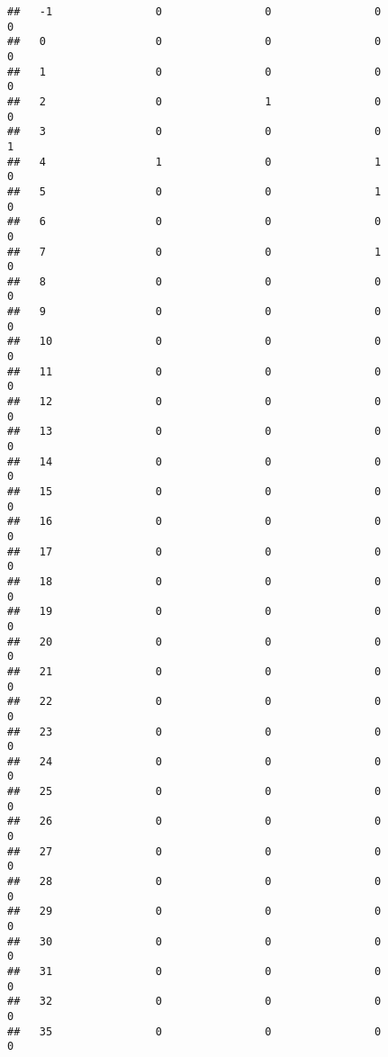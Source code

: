 \documentclass[]{article}
\begin{document}
\begin{verbatim}
##   -1                0                0                0                0
##   0                 0                0                0                0
##   1                 0                0                0                0
##   2                 0                1                0                0
##   3                 0                0                0                1
##   4                 1                0                1                0
##   5                 0                0                1                0
##   6                 0                0                0                0
##   7                 0                0                1                0
##   8                 0                0                0                0
##   9                 0                0                0                0
##   10                0                0                0                0
##   11                0                0                0                0
##   12                0                0                0                0
##   13                0                0                0                0
##   14                0                0                0                0
##   15                0                0                0                0
##   16                0                0                0                0
##   17                0                0                0                0
##   18                0                0                0                0
##   19                0                0                0                0
##   20                0                0                0                0
##   21                0                0                0                0
##   22                0                0                0                0
##   23                0                0                0                0
##   24                0                0                0                0
##   25                0                0                0                0
##   26                0                0                0                0
##   27                0                0                0                0
##   28                0                0                0                0
##   29                0                0                0                0
##   30                0                0                0                0
##   31                0                0                0                0
##   32                0                0                0                0
##   35                0                0                0                0

\end{verbatim}
\end{document}
